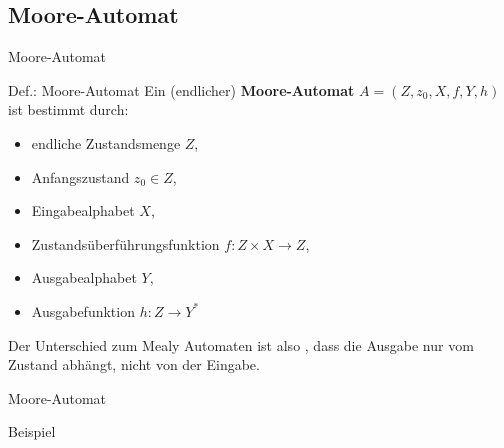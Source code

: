 \subsection{Moore-Automat}
\begin{frame}{Moore-Automat}
	\begin{block}{Def.: Moore-Automat}
		Ein (endlicher) \textbf{Moore-Automat} $A=(Z, z_0, X, f, Y, h)$ ist bestimmt durch:
		\begin{itemize}
			\item endliche Zustandsmenge $Z$,
			\item Anfangszustand $z_0 \in Z$,
			\item Eingabealphabet $X$,
			\item Zustandsüberführungsfunktion $f: Z \times X \rightarrow Z$,
			\item Ausgabealphabet $Y$,
			\item Ausgabefunktion $h: Z \rightarrow Y^{\ast}$
		\end{itemize}

	Der Unterschied zum Mealy Automaten ist also , dass die Ausgabe nur vom Zustand abhängt, nicht von der Eingabe.

	\end{block}
\end{frame}

\begin{frame}[fragile]{Moore-Automat}
	\begin{exampleblock}{Beispiel}
		\begin{figure}[ht]
  \centering
\end{figure}
	\end{exampleblock}
\end{frame}

